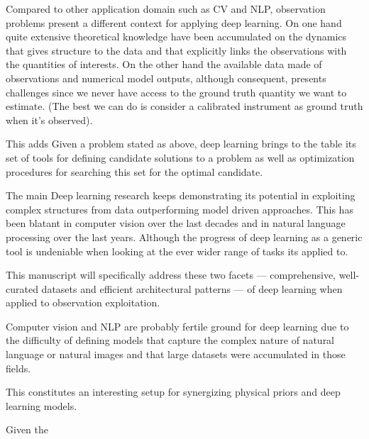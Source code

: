 \begin{bibunit}
Compared to other application domain such as CV and NLP, observation problems present a different context for applying deep learning. 
On one hand quite extensive theoretical knowledge have been accumulated on the dynamics that gives structure to the data and that explicitly links the observations with the quantities of interests.  
On the other hand the available data made of observations and numerical model outputs, although consequent, presents challenges since we never have access to the ground truth quantity we want to estimate. (The best we can do is consider a calibrated instrument as ground truth when it's observed). 



This adds
Given a problem stated as above, deep learning brings to the table its set of tools for defining candidate solutions to a problem as well as optimization procedures for searching this set for the optimal candidate.

The main 
Deep learning research keeps demonstrating its potential in exploiting complex structures from data outperforming model driven approaches.
This has been blatant in computer vision over the last decades and in natural language processing over the last years.
Although the progress of deep learning as a generic tool is undeniable when looking at the ever wider range of tasks its applied to.

This manuscript will specifically address these two facets — comprehensive, well-curated datasets and efficient architectural patterns — of deep learning when applied to observation exploitation.

Computer vision and NLP are probably fertile ground for deep learning due to the difficulty of defining models that capture the complex nature of natural language or natural images and that large datasets were accumulated in those fields. 



This constitutes an interesting setup for synergizing physical priors and deep learning models.

Given the 


\end{bibunit}
